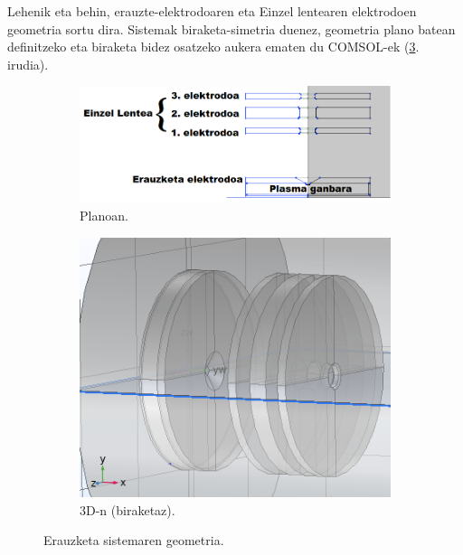 \documentclass[12pt]{article}
\numberwithin{figure}{section}
\numberwithin{equation}{section}
\begin{document}
Lehenik eta behin, erauzte-elektrodoaren eta Einzel lentearen elektrodoen geometria sortu dira. Sistemak biraketa-simetria duenez, geometria plano batean definitzeko eta biraketa bidez osatzeko aukera ematen du COMSOL-ek (\ref{fig:erauzketa_sistema}. irudia). 

\begin{figure}[h]
    \centering
    \begin{subfigure}[b]{0.6\textwidth}
        \centering
        \includegraphics[width=\linewidth]{3 - COMSOL/extraction_plane.png}
        \caption{Planoan.}
        \label{fig:3d_plane}
    \end{subfigure}
    \hspace{0.02\textwidth}
    \begin{subfigure}[b]{0.26\textwidth}
        \centering
        \includegraphics[width=\linewidth]{3 - COMSOL/extracion_3d.PNG}
        \caption{3D-n (biraketaz).}
        \label{fig:3d_extraction}
    \end{subfigure}
    \caption{Erauzketa sistemaren geometria.}
    \label{fig:erauzketa_sistema}
\end{figure}
\end{document}
